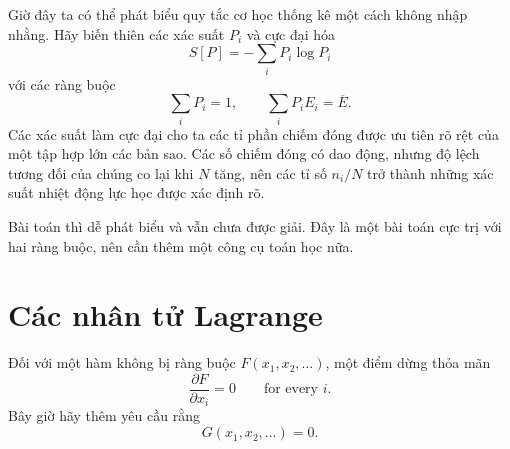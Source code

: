 Giờ đây ta có thể phát biểu quy tắc cơ học thống kê một cách không nhập nhằng. Hãy biến thiên các xác suất \(P_i\) và cực đại hóa
\begin{equation}
 S[P]=-\sum_iP_i\log P_i
 \label{eq:sm3-maximize-entropy}
\end{equation}
với các ràng buộc
\begin{equation}
 \sum_iP_i=1,
 \qquad
 \sum_iP_iE_i=\overline E.
 \label{eq:sm3-maxent-constraints}
\end{equation}
Các xác suất làm cực đại cho ta các tỉ phần chiếm đóng được ưu tiên rõ rệt của một tập hợp lớn các bản sao. Các số chiếm đóng có dao động, nhưng độ lệch tương đối của chúng co lại khi \(N\) tăng, nên các tỉ số \(n_i/N\) trở thành những xác suất nhiệt động lực học được xác định rõ.

\begin{classroomqa}
\end{classroomqa}

Bài toán thì dễ phát biểu và vẫn chưa được giải. Đây là một bài toán cực trị với hai ràng buộc, nên cần thêm một công cụ toán học nữa.

\section{Các nhân tử Lagrange}

Đối với một hàm không bị ràng buộc \(F(x_1,x_2,\ldots)\), một điểm dừng
thỏa mãn
\begin{equation}
 \frac{\partial F}{\partial x_i}=0
 \qquad\text{for every }i.
 \label{eq:sm3-unconstrained-stationary}
\end{equation}
Bây giờ hãy thêm yêu cầu rằng
\begin{equation}
 G(x_1,x_2,\ldots)=0.
 \label{eq:sm3-one-constraint}
\end{equation}

\begin{classroomqa}
\end{classroomqa}

